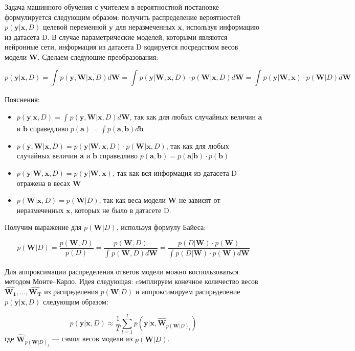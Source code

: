 \documentclass{article}
\begin{document}
Задача машинного обучения с учителем в вероятностной постановке формулируется следующим образом: получить распределение вероятностей $p(\pmb{y} | \pmb{x}, D)$ целевой переменной $\pmb{y}$ для неразмеченных $\pmb{x}$, используя информацию из датасета D. В случае параметрические моделей, которыми являются нейронные сети, информация из датасета D кодируется посредством весов модели $\pmb{W}$. Сделаем следующие преобразования:

\[
p(\pmb{y} | \pmb{x}, D) =
\int_{}{} p(\pmb{y}, \pmb{W} | \pmb{x}, D) d \pmb{W} =
\int_{}{} p(\pmb{y} | \pmb{W}, \pmb{x}, D) \cdot p(\pmb{W} | \pmb{x}, D) d \pmb{W} =
\int_{}{} p(\pmb{y} | \pmb{W}, \pmb{x}) \cdot p(\pmb{W} | D) d \pmb{W}
\]

Пояснения:
\begin{itemize}
 \item $p(\pmb{y} | \pmb{x}, D) = \int_{}{} p(\pmb{y}, \pmb{W} | \pmb{x}, D) d \pmb{W}$, так как для любых случайных величин $\pmb{a}$ и $\pmb{b}$ справедливо $p(\pmb{a}) = \int p(\pmb{a}, \pmb{b}) d \pmb{b}$
 \item $p(\pmb{y}, \pmb{W} | \pmb{x}, D) = p(\pmb{y} | \pmb{W}, \pmb{x}, D) \cdot p(\pmb{W} | \pmb{x}, D)$, так как для любых случайных величин $\pmb{a}$ и $\pmb{b}$ справедливо $p(\pmb{a}, \pmb{b}) = p(\pmb{a}| \pmb{b}) \cdot p(\pmb{b})$
 \item $p(\pmb{y} | \pmb{W}, \pmb{x}, D) = p(\pmb{y} | \pmb{W}, \pmb{x})$, так как вся информация из датасета D отражена в весах $\pmb{W}$
 \item $p(\pmb{W} | \pmb{x}, D) = p(\pmb{W} | D)$, так как веса модели $\pmb{W}$ не зависят от неразмеченных $\pmb{x}$, которых не было в датасете D.
\end{itemize}

Получим выражение для $p(\pmb{W}| D)$, используя формулу Байеса:

\[
p(\pmb{W}| D) =
\dfrac{p(\pmb{W}, D)}{p(D)} =
\dfrac{p(\pmb{W}, D)}{\int_{}{} p(\pmb{W}, D) d \pmb{W}} =
\dfrac{p(D | \pmb{W}) \cdot p(\pmb{W})}{\int_{}{} p(D | \pmb{W}) \cdot p(\pmb{W}) d \pmb{W}}
\]

Для аппроксимации распределения ответов модели можно воспользоваться методом Монте--Карло. Идея следующая: cэмплируем конечное количество весов $\hat{\pmb{W_1}}, \dots, \hat{\pmb{W_T}}$ из распределения $p(\pmb{W}| D)$  и аппроксимируем распределение $p(\pmb{y} | \pmb{x}, D)$ следующим образом:

\[
p(\pmb{y} | \pmb{x}, D)
\approx \dfrac{1}{T} \sum_{t=1}^{T}{p(\pmb{y} | \pmb{x}, \hat{\pmb{W}}_{p(\pmb{W} | D)_{t}})}
\]
где $\hat{\pmb{W}}_{p(\pmb{W} | D)_{t}}$ --- сэмпл весов модели из $p(\pmb{W}| D)$.
\end{document}

